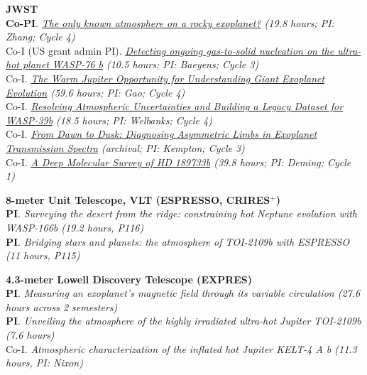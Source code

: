 \documentclass[letterpaper,12pt]{article}
\renewcommand{\small}{\normalsize}
\begin{document}
\small
  \begin{list}{}{\cvlist}  
  

  
  
  \item[{\color{numcolor}}]\textbf{JWST} \\
\textbf{Co-PI}. \textit{\href{https://www.stsci.edu/jwst/science-execution/program-information?id=7875}{The only known atmosphere on a rocky exoplanet?} (19.8 hours; PI: Zhang; Cycle 4)} \\
  Co-I (US grant admin PI). \textit{\href{https://www.stsci.edu/jwst/science-execution/program-information?id=6045}{Detecting ongoing gas-to-solid nucleation on the ultra-hot planet WASP-76 b} (10.5 hours; PI: Baeyens; Cycle 3)} \\

Co-I. \textit{\href{https://www.stsci.edu/jwst/science-execution/program-information?id=9025}{The Warm Jupiter Opportunity for Understanding Giant Exoplanet Evolution} (59.6 
 hours; PI: Gao; Cycle 4)} \\
Co-I. \textit{\href{https://www.stsci.edu/jwst/science-execution/program-information?id=8017}{Resolving Atmospheric Uncertainties and Building a Legacy Dataset for WASP-39b} (18.5 hours; PI: Welbanks; Cycle 4)} \\
  Co-I. \textit{\href{https://www.stsci.edu/jwst/science-execution/program-information?id=5275}{From Dawn to Dusk: Diagnosing Asymmetric Limbs in Exoplanet Transmission Spectra} (archival; PI: Kempton; Cycle 3)} \\ 
  Co-I. \textit{\href{https://www.stsci.edu/jwst/science-execution/program-information?id=1633}{A Deep Molecular Survey of HD 189733b} (39.8 hours; PI: Deming; Cycle 1)}

  \item[{\color{numcolor}}]\textbf{8-meter Unit Telescope, VLT (ESPRESSO, CRIRES$^+$)} \\

\textbf{PI}. \textit{Surveying the desert from the ridge: constraining hot Neptune evolution with WASP-166b (19.2 hours, P116)} \\
\textbf{PI}. \textit{Bridging stars and planets: the atmosphere of TOI-2109b with ESPRESSO (11 hours, P115)} \\


  \item[{\color{numcolor}}]\textbf{4.3-meter Lowell Discovery Telescope (EXPRES)} \\
      \textbf{PI}. \textit{Measuring an exoplanet’s magnetic field through its variable circulation (27.6 hours across 2 semesters)}\\
     \textbf{PI}. \textit{Unveiling the atmosphere of the highly irradiated ultra-hot Jupiter TOI-2109b (7.6 hours)}\\
     Co-I. \textit{Atmospheric characterization of the inflated hot Jupiter KELT-4 A b (11.3 hours, PI: Nixon)}


\end{list}
\end{document}
